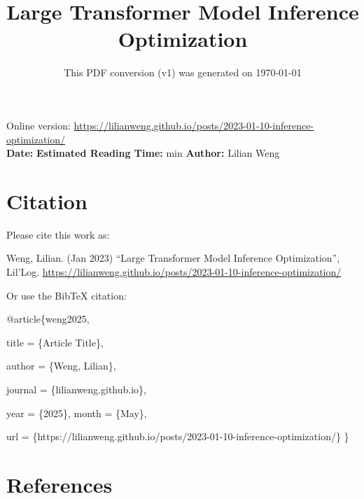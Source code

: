 \documentclass[12pt]{article}
\title{Large Transformer Model Inference Optimization}
\date{This PDF conversion (v1) was generated on \today\footnotemark}
\begin{document}
\maketitle
\begin{center}
    Online version: \url{https://lilianweng.github.io/posts/2023-01-10-inference-optimization/} \\
    \textbf{Date:} \quad
    \textbf{Estimated Reading Time:}  min \quad
    \textbf{Author:} Lilian Weng
\end{center}




\newpage
\tableofcontents
\newpage
\vspace{1em}
\n\n\n\section{Citation}
Please cite this work as:

\begin{tcolorbox}[colback=black!5!white, colframe=black!80!white, boxrule=0.5pt, arc=2mm, left=1mm, right=1mm, top=1mm, bottom=1mm]
  Weng, Lilian. (Jan 2023) ``Large Transformer Model Inference Optimization'', Lil'Log. \url{https://lilianweng.github.io/posts/2023-01-10-inference-optimization/}
  \end{tcolorbox}

Or use the BibTeX citation:

\begin{tcolorbox}[
    colback=black!5!white,
    colframe=black!80!white,
    boxrule=0.5pt,
    arc=2mm,
    left=1mm,
    right=1mm,
    top=1mm,
    bottom=1mm,
    listing only,
    listing options={
      basicstyle=\ttfamily\footnotesize,
      breaklines=true,
      literate={\{}{{\char`\{}}1 {\}}{{\char`\}}}1
    }
  ]
  @article\{weng2025,

    title   = \{Article Title\},

    author  = \{Weng, Lilian\},

    journal = \{lilianweng.github.io\},

    year    = \{2025\},
    month   = \{May\},

    url     = \{https://lilianweng.github.io/posts/2023-01-10-inference-optimization/\}\n
  \}
  \end{tcolorbox}

\newpage
\section{References}

\n
\end{document}

